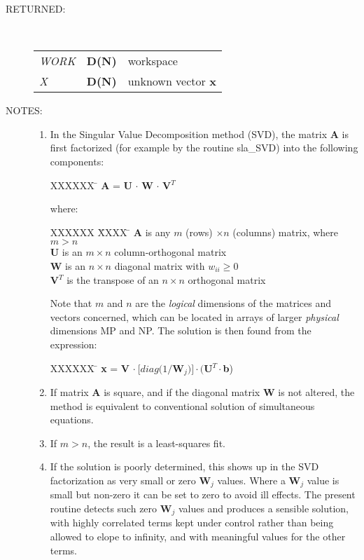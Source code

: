 \documentclass[11pt,twoside]{article}
\newlength{\oldspacing}
\newcommand{\args}[2]
{
  \goodbreak
  \setlength{\oldspacing}{\topsep}
  \setlength{\topsep}{0.3ex}
  \begin{description}
  \item[#1]:\\[1.5ex]
    \begin{tabular}{p{7em}p{6em}p{22em}}
      #2
    \end{tabular}
  \end{description}
  \setlength{\topsep}{\oldspacing}
}
\renewcommand{\args}[2]
   {
     \begin{description}
        \item[#1:]\\
        \begin{tabular}{p{7em}p{6em}l}
           #2
        \end{tabular}
     \end{description}
   }
\newcommand{\spec}[3]
{
  {\em {#1}} & {\bf \mbox{#2}} & {#3}
}
\newcommand{\notes}[1]
{
  \goodbreak
  \setlength{\oldspacing}{\topsep}
  \setlength{\topsep}{0.3ex}
  \begin{description}
    \item[NOTES]:
        #1
  \end{description}
  \setlength{\topsep}{\oldspacing}
}
\renewcommand{\notes}[1]
   {
      \begin{description}
         \item[NOTES:]
            #1
      \end{description}
   }
\begin{document}
\args{RETURNED}
{
 \spec{WORK}{D(N)}{workspace} \\
 \spec{X}{D(N)}{unknown vector {\bf x}}
}
\notes
{
 \begin{enumerate}
  \item In the Singular Value Decomposition method (SVD),
        the matrix {\bf A} is first factorized (for example by
        the routine sla\_SVD) into the following components:
        \begin{tabbing}
        XXXXXX \= \kill
        \> {\bf A} = {\bf U} $\cdot$ {\bf W} $\cdot$ {\bf V}$^{T}$
        \end{tabbing}
        where:
        \begin{tabbing}
        XXXXXX \= XXXX \= \kill
        \> {\bf A} \> is any $m$ (rows) $\times n$ (columns) matrix,
                      where $m > n$ \\
        \> {\bf U} \> is an $m \times n$ column-orthogonal matrix \\
        \> {\bf W} \> is an $n \times n$ diagonal matrix with
                      $w_{ii} \geq 0$ \\
        \> {\bf V}$^{T}$ \> is the transpose of an $n \times n$
                            orthogonal matrix
        \end{tabbing}
        Note that $m$ and $n$ are the {\it logical}\/ dimensions of the
        matrices and vectors concerned, which can be located in
        arrays of larger {\it physical}\/ dimensions MP and NP.
        The solution is then found from the expression:
        \begin{tabbing}
        XXXXXX \= \kill
        \> {\bf x} = {\bf V} $\cdot~[diag(1/${\bf W}$_{j})]
           \cdot (${\bf U}$^{T} \cdot${\bf b})
        \end{tabbing}
  \item If matrix {\bf A} is square, and if the diagonal matrix {\bf W} is not
        altered, the method is equivalent to conventional solution
        of simultaneous equations.
  \item If $m > n$, the result is a least-squares fit.
  \item If the solution is poorly determined, this shows up in the
        SVD factorization as very small or zero {\bf W}$_{j}$ values.  Where
        a {\bf W}$_{j}$ value is small but non-zero it can be set to zero to
        avoid ill effects.  The present routine detects such zero
        {\bf W}$_{j}$ values and produces a sensible solution, with highly
        correlated terms kept under control rather than being allowed
        to elope to infinity, and with meaningful values for the
       other terms.
 \end{enumerate}
}
\end{document}
